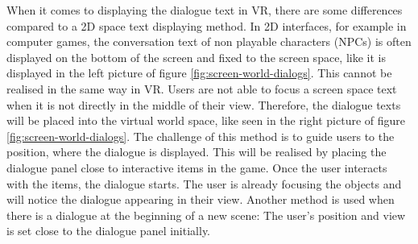 When it comes to displaying the dialogue text in VR, there are some differences compared to a 2D space text displaying method. In 2D interfaces, for example in computer games, the conversation text of non playable characters (NPCs) is often displayed on the bottom of the screen and fixed to the screen space, like it is displayed in the left picture of figure \ref{fig:screen-world-dialogs}. This cannot be realised in the same way in VR. Users are not able to focus a screen space text when it is not directly in the middle of their view. Therefore, the dialogue texts will be placed into the virtual world space, like seen in the right picture of figure \ref{fig:screen-world-dialogs}. The challenge of this method is to guide users to the position, where the dialogue is displayed. This will be realised by placing the dialogue panel close to interactive items in the game. Once the user interacts with the items, the dialogue starts. The user is already focusing the objects and will notice the dialogue appearing in their view. Another method is used when there is a dialogue at the beginning of a new scene: The user's position and view is set close to the dialogue panel initially.
